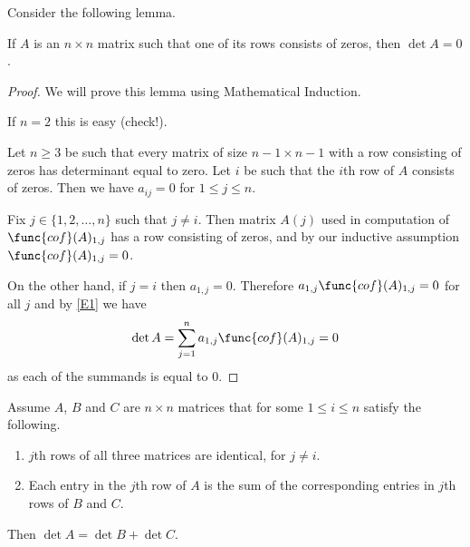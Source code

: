 Consider the following lemma.

\begin{lemma}{}\label{lem:L1} 
If $A$ is an $n\times n$ matrix such that one of its rows consists of zeros, then 
$\det A=0$. 
\end{lemma} 

\begin{proof} 
We will prove this lemma using Mathematical Induction. 

If $n=2$ this is easy (check!). 

Let $n\geq 3$ be such that every matrix of size $n-1\times n-1$ with a row consisting of zeros
has determinant equal to zero.  
Let $i$ be such that the $i$th row of $A$ consists of zeros. 
Then we have $a_{ij}=0$ for $1\leq j\leq n$. 

Fix $j\in \{1,2, \dots ,n\}$ such that $j\neq i$. Then  matrix $A(j)$ used in computation of
 $\func{cof}(A)_{1,j}$ has a row consisting of zeros, and by our inductive 
 assumption $\func{cof}(A)_{1,j}=0$. 

On the other hand, if $j=i$ then $a_{1,j}=0$.  
Therefore $a_{1,j}\func{cof}(A)_{1,j}=0$ for all $j$ and by \eqref{E1} we have 
\[
\det A=\sum_{j=1}^n a_{1,j} \func{cof}(A)_{1,j}=0
\]
as each of the summands is equal to 0. 
\end{proof} 

\begin{lemma}{}\label{lem:L2} 
Assume $A$, $B$ and $C$ are $n\times n$ matrices that for some 
 $1\leq i\leq n$ satisfy the following. 
\begin{enumerate}
\item $j$th rows of all three matrices are identical, for $j\neq i$. 

\item Each entry in the $j$th row of $A$ is the sum of the corresponding 
entries in $j$th rows of $B$ and $C$. 
\end{enumerate}

Then $\det A=\det B+\det C$. 
\end{lemma} 

